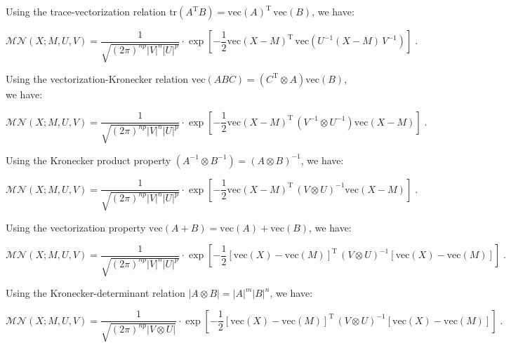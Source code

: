 \documentclass[a4paper,12pt,twoside]{book}
\begin{document}
Using the trace-vectorization relation $\mathrm{tr}(A^\mathrm{T} B) = \mathrm{vec}(A)^\mathrm{T} \, \mathrm{vec}(B)$, we have:

\begin{equation} \label{eq:matn-mvn-matn-mvn-s2}
\mathcal{MN}(X; M, U, V) = \frac{1}{\sqrt{(2\pi)^{np} |V|^n |U|^p}} \cdot \exp\left[-\frac{1}{2} \mathrm{vec}(X-M)^\mathrm{T} \, \mathrm{vec}\left( U^{-1} (X-M) \, V^{-1} \right) \right] \; .
\end{equation}

Using the vectorization-Kronecker relation $\mathrm{vec}(ABC) = \left( C^\mathrm{T} \otimes A \right) \mathrm{vec}(B)$, we have:

\begin{equation} \label{eq:matn-mvn-matn-mvn-s3}
\mathcal{MN}(X; M, U, V) = \frac{1}{\sqrt{(2\pi)^{np} |V|^n |U|^p}} \cdot \exp\left[-\frac{1}{2} \mathrm{vec}(X-M)^\mathrm{T} \, \left( V^{-1} \otimes U^{-1} \right) \mathrm{vec}(X-M) \right] \; .
\end{equation}

Using the Kronecker product property $\left( A^{-1} \otimes B^{-1} \right) = \left( A \otimes B \right)^{-1}$, we have:

\begin{equation} \label{eq:matn-mvn-matn-mvn-s4}
\mathcal{MN}(X; M, U, V) = \frac{1}{\sqrt{(2\pi)^{np} |V|^n |U|^p}} \cdot \exp\left[-\frac{1}{2} \mathrm{vec}(X-M)^\mathrm{T} \, \left( V \otimes U \right)^{-1} \mathrm{vec}(X-M) \right] \; .
\end{equation}

Using the vectorization property $\mathrm{vec}(A+B) = \mathrm{vec}(A) + \mathrm{vec}(B)$, we have:

\begin{equation} \label{eq:matn-mvn-matn-mvn-s5}
\mathcal{MN}(X; M, U, V) = \frac{1}{\sqrt{(2\pi)^{np} |V|^n |U|^p}} \cdot \exp\left[-\frac{1}{2} \left[ \mathrm{vec}(X) - \mathrm{vec}(M) \right]^\mathrm{T} \, \left( V \otimes U \right)^{-1} \left[ \mathrm{vec}(X) - \mathrm{vec}(M) \right] \right] \; .
\end{equation}

Using the Kronecker-determinant relation $\lvert A \otimes B \rvert = \lvert A \rvert^m \lvert B \rvert^n$, we have:

\begin{equation} \label{eq:matn-mvn-matn-mvn-s6}
\mathcal{MN}(X; M, U, V) = \frac{1}{\sqrt{(2\pi)^{np} |V \otimes U|}} \cdot \exp\left[-\frac{1}{2} \left[ \mathrm{vec}(X) - \mathrm{vec}(M) \right]^\mathrm{T} \, \left( V \otimes U \right)^{-1} \left[ \mathrm{vec}(X) - \mathrm{vec}(M) \right] \right] \; .
\end{equation}
\end{document}
